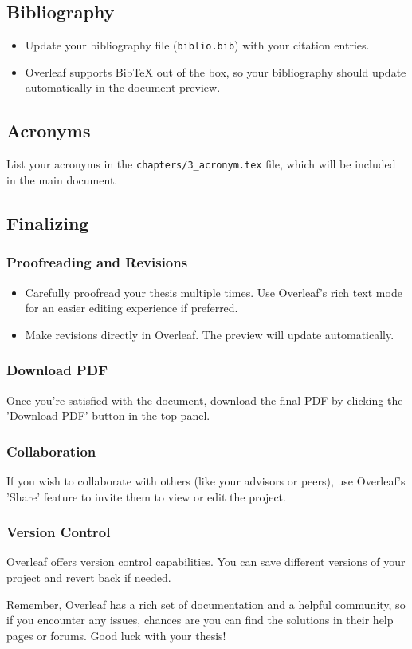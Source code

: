 \subsection{Bibliography}
\begin{itemize}
    \item Update your bibliography file (\texttt{biblio.bib}) with your citation entries.
    \item Overleaf supports BibTeX out of the box, so your bibliography should update automatically in the document preview.
\end{itemize}

\subsection{Acronyms}
List your acronyms in the \texttt{chapters/3\_acronym.tex} file, which will be included in the main document.

\subsection{Finalizing}

\subsubsection{Proofreading and Revisions}
\begin{itemize}
    \item Carefully proofread your thesis multiple times. Use Overleaf's rich text mode for an easier editing experience if preferred.
    \item Make revisions directly in Overleaf. The preview will update automatically.
\end{itemize}

\subsubsection{Download PDF}
Once you're satisfied with the document, download the final PDF by clicking the 'Download PDF' button in the top panel.

\subsubsection{Collaboration}
If you wish to collaborate with others (like your advisors or peers), use Overleaf's 'Share' feature to invite them to view or edit the project.

\subsubsection{Version Control}
Overleaf offers version control capabilities. You can save different versions of your project and revert back if needed.

Remember, Overleaf has a rich set of documentation and a helpful community, so if you encounter any issues, chances are you can find the solutions in their help pages or forums. Good luck with your thesis!
